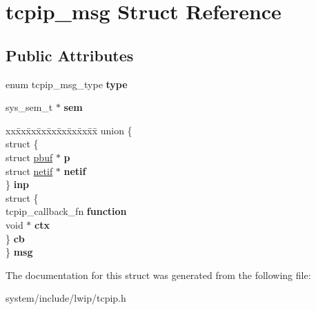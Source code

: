\hypertarget{structtcpip__msg}{}\section{tcpip\+\_\+msg Struct Reference}
\label{structtcpip__msg}
\subsection*{Public Attributes}
\begin{DoxyCompactItemize}
\item 
\hypertarget{structtcpip__msg_a5b992b509c516199c800c913993574c1}{}enum tcpip\+\_\+msg\+\_\+type {\bfseries type}\label{structtcpip__msg_a5b992b509c516199c800c913993574c1}

\item 
\hypertarget{structtcpip__msg_a68b745804255e3b227ec2f5ef0f8e136}{}sys\+\_\+sem\+\_\+t $\ast$ {\bfseries sem}\label{structtcpip__msg_a68b745804255e3b227ec2f5ef0f8e136}

\item 
\hypertarget{structtcpip__msg_a38c897bf24dd203fd685fd8233329352}{}\begin{tabbing}
xx\=xx\=xx\=xx\=xx\=xx\=xx\=xx\=xx\=\kill
union \{\\
\>struct \{\\
\>\>struct \hyperlink{structpbuf}{pbuf} $\ast$ {\bfseries p}\\
\>\>struct \hyperlink{structnetif}{netif} $\ast$ {\bfseries netif}\\
\>\} {\bfseries inp}\\
\>struct \{\\
\>\>tcpip\_callback\_fn {\bfseries function}\\
\>\>void $\ast$ {\bfseries ctx}\\
\>\} {\bfseries cb}\\
\} {\bfseries msg}\label{structtcpip__msg_a38c897bf24dd203fd685fd8233329352}
\\

\end{tabbing}\end{DoxyCompactItemize}


The documentation for this struct was generated from the following file\+:\begin{DoxyCompactItemize}
\item 
system/include/lwip/tcpip.\+h\end{DoxyCompactItemize}
